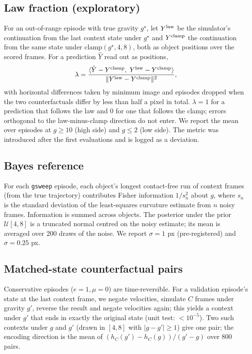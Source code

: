 \subsection{Law fraction (exploratory)}
\label{app:lambda}
For an out-of-range episode with true gravity $g^\star$, let $Y^{\rm law}$ be the simulator's
continuation from the last context state under $g^\star$ and $Y^{\rm clamp}$ the continuation from
the same state under $\mathrm{clamp}(g^\star, 4, 8)$, both as object positions over the scored
frames. For a prediction $\hat Y$ read out as positions,
\[
\lambda = \frac{\langle \hat Y - Y^{\rm clamp},\; Y^{\rm law} - Y^{\rm clamp}\rangle}
               {\| Y^{\rm law} - Y^{\rm clamp}\|^2},
\]
with horizontal differences taken by minimum image and episodes dropped when the two
counterfactuals differ by less than half a pixel in total. $\lambda=1$ for a prediction that
follows the law and $0$ for one that follows the clamp; errors orthogonal to the law-minus-clamp
direction do not enter. We report the mean over episodes at $g\ge 10$ (high side) and $g\le 2$
(low side). The metric was introduced after the first evaluations and is logged as a deviation.

\subsection{Bayes reference}
For each \texttt{gsweep} episode, each object's longest contact-free run of context frames
(from the true trajectory) contributes Fisher information $1/s_n^2$ about $g$, where $s_n$ is the
standard deviation of the least-squares curvature estimate from $n$ noisy frames. Information is
summed across objects. The posterior under the prior $\mathcal U[4,8]$ is a truncated normal centred
on the noisy estimate; its mean is averaged over 200 draws of the noise. We report $\sigma=1$ px
(pre-registered) and $\sigma=0.25$ px.

\subsection{Matched-state counterfactual pairs}
Conservative episodes ($e=1,\mu=0$) are time-reversible. For a validation episode's state at the last
context frame, we negate velocities, simulate $C$ frames under gravity $g'$, reverse the result and
negate velocities again; this yields a context under $g'$ that ends in exactly the original state
(unit test: $<10^{-5}$). Two such contexts under $g$ and $g'$ (drawn in $[4,8]$ with $|g-g'|\ge1$)
give one pair; the encoding direction is the mean of $(h_C(g')-h_C(g))/(g'-g)$ over 800 pairs.

